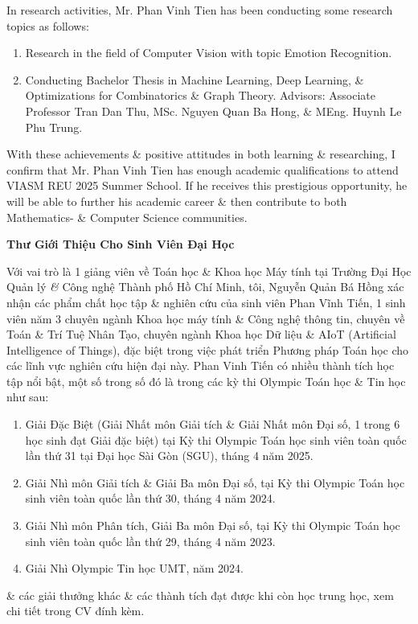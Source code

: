 \documentclass[11pt]{article}
\begin{document}
In research activities, Mr. {\sc Phan Vinh Tien} has been conducting some research topics as follows:
\begin{enumerate}
    \item Research in the field of Computer Vision with topic Emotion Recognition.
    
    \item Conducting Bachelor Thesis in Machine Learning, Deep Learning, \& Optimizations for Combinatorics \& Graph Theory. Advisors: Associate Professor {\sc Tran Dan Thu}, MSc. {\sc Nguyen Quan Ba Hong}, \& MEng. {\sc Huynh Le Phu Trung}.
\end{enumerate}
With these achievements \& positive attitudes in both learning \& researching, I confirm that Mr. {\sc Phan Vinh Tien} has enough academic qualifications to attend VIASM REU 2025 Summer School. If he receives this prestigious opportunity, he will be able to further his academic career \& then contribute to both Mathematics- \& Computer Science communities.

\begin{center}
    \LARGE
    \textbf{\textsf{Thư Giới Thiệu Cho Sinh Viên Đại Học}}
\end{center}
Với vai trò là 1 giảng viên về Toán học \& Khoa học Máy tính tại Trường Đại Học Quản lý {\it\&} Công nghệ Thành phố Hồ Chí Minh, tôi, {\sc Nguyễn Quản Bá Hồng} xác nhận các phẩm chất học tập \& nghiên cứu của sinh viên {\sc Phan Vĩnh Tiến}, 1 sinh viên năm 3 chuyên ngành Khoa học máy tính \& Công nghệ thông tin, chuyên về Toán \& Trí Tuệ Nhân Tạo, chuyên ngành Khoa học Dữ liệu \& AIoT (Artificial Intelligence of Things), đặc biệt trong việc phát triển Phương pháp Toán học cho các lĩnh vực nghiên cứu hiện đại này. {\sc Phan Vinh Tiến} có nhiều thành tích học tập nổi bật, một số trong số đó là trong các kỳ thi Olympic Toán học \& Tin học như sau:
\begin{enumerate}
    \item Giải Đặc Biệt (Giải Nhất môn Giải tích \& Giải Nhất môn Đại số, 1 trong 6 học sinh đạt Giải đặc biệt) tại Kỳ thi Olympic Toán học sinh viên toàn quốc lần thứ 31 tại Đại học Sài Gòn (SGU), tháng 4 năm 2025.
    
    \item Giải Nhì môn Giải tích \& Giải Ba môn Đại số, tại Kỳ thi Olympic Toán học sinh viên toàn quốc lần thứ 30, tháng 4 năm 2024.
    
    \item Giải Nhì môn Phân tích, Giải Ba môn Đại số, tại Kỳ thi Olympic Toán học sinh viên toàn quốc lần thứ 29, tháng 4 năm 2023.
    
    \item Giải Nhì Olympic Tin học UMT, năm 2024.
\end{enumerate}
\& các giải thưởng khác \& các thành tích đạt được khi còn học trung học, xem chi tiết trong CV đính kèm.
\end{document}
